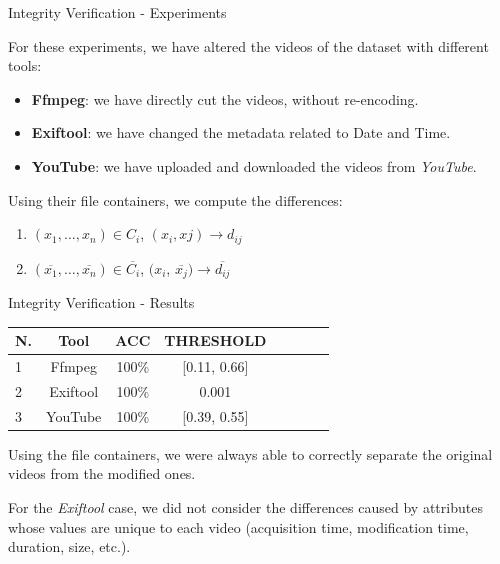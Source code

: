 \begin{tframe}{Integrity Verification - Experiments}

For these experiments, we have altered the videos of the dataset with different tools:

\begin{itemize}
\item \textbf{Ffmpeg}: we have directly cut the videos, without re-encoding.
\vspace{0.1cm}
\item \textbf{Exiftool}: we have changed the metadata related to Date and Time.
\vspace{0.1cm}
\item \textbf{YouTube}: we have uploaded and downloaded the videos from \emph{YouTube}.
\end{itemize}

\vspace{0.5cm}

Using their file containers, we compute the differences:

\begin{enumerate}

\item $(x_{1},\ldots,x_{n}) \in C_{i}$, $(x_{i}, x{j}) \rightarrow d_{ij}$
\vspace{0.1cm}
\item $(\overline{x_{1}},\ldots,\overline{x_{n}}) \in \overline{C_{i}}$, $(x_{i}$, $\overline{x_{j}}) \rightarrow \overline{d_{ij}}$ 

\end{enumerate}

\end{tframe}

\begin{tframe}{Integrity Verification - Results}

\begin{footnotesize}
\begin{table}[h!]
\centering
\begin{tabular}{l c c c c c c c} 
\hline \hline 
\textbf{N.} & \textbf{Tool} & \textbf{ACC} & \textbf{THRESHOLD}\\ [0.5ex]
\hline
1 & Ffmpeg & 100\% & [0.11, 0.66]\\
2 & Exiftool & 100\% &	0.001 \\
3 &	YouTube & 100\% & [0.39, 0.55] \\ 

\hline
\end{tabular}
\end{table}
\end{footnotesize}

\vspace{0.2cm}
Using the file containers, we were always able to correctly separate the original videos from the modified ones.

\vspace{0.5cm}
For the \emph{Exiftool} case, we did not consider the differences caused by attributes whose values are unique to each video (acquisition time, modification time, duration, size, etc.).

\end{tframe}

